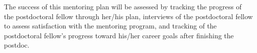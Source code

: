 \documentclass{proposalnsf}
\begin{document}
The success of this mentoring plan will be assessed by tracking the progress of the postdoctoral fellow through her/his plan, interviews of the postdoctoral fellow to assess satisfaction with the mentoring program, and tracking of the postdoctoral fellow’s progress toward his/her career goals after finishing the postdoc.
\end{document}
